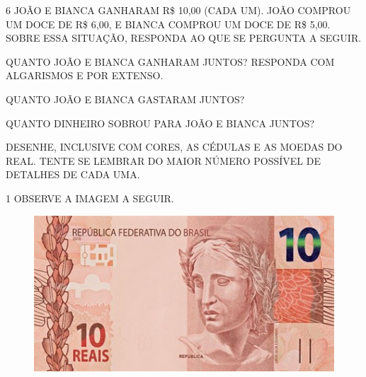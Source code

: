 
\num{6} JOÃO E BIANCA GANHARAM R\$ 10,00 (CADA UM). JOÃO COMPROU UM DOCE DE R\$ 6,00,
E BIANCA COMPROU UM DOCE DE R\$ 5,00. SOBRE ESSA SITUAÇÃO, RESPONDA AO QUE SE PERGUNTA A SEGUIR.

\begin{escolha}
\item QUANTO JOÃO E BIANCA GANHARAM JUNTOS? RESPONDA COM ALGARISMOS E POR EXTENSO.


\item QUANTO JOÃO E BIANCA GASTARAM JUNTOS?


\item QUANTO DINHEIRO SOBROU PARA JOÃO E BIANCA JUNTOS?


\item DESENHE, INCLUSIVE COM CORES, AS CÉDULAS E AS MOEDAS DO REAL. TENTE SE LEMBRAR DO MAIOR NÚMERO POSSÍVEL DE DETALHES DE CADA UMA.
\end{escolha}

\begin{mdframed}[linewidth=2pt,linecolor=salmao,roundcorner=10pt]
\vspace{9cm}
\end{mdframed}



\num{1} OBSERVE A IMAGEM A SEGUIR.


\begin{figure}[htpb!]
\centering
\includegraphics[width=\textwidth]{../ilustracoes/MAT1/SAEB_1ANO_MAT_FIGURA82.jpg}
\end{figure}

